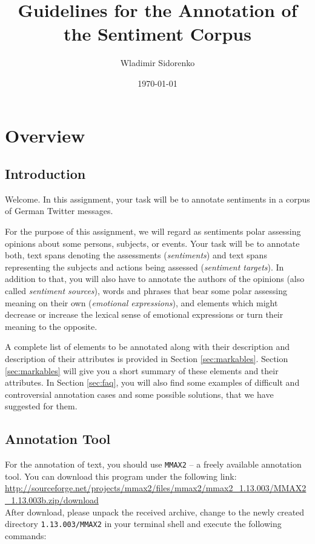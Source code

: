 \documentclass[11pt,a4paper]{article}
\author{Wladimir Sidorenko}
\date{\today}
\title{Guidelines for the Annotation of the Sentiment Corpus}
\begin{document}
\maketitle{}
\section{Overview}
\subsection{Introduction}

Welcome.  In this assignment, your task will be to annotate sentiments in a
corpus of German Twitter messages.

For the purpose of this assignment, we will regard as sentiments polar
assessing opinions about some persons, subjects, or events.  Your task will be
to annotate both, text spans denoting the assessments (\textit{sentiments})
and text spans representing the subjects and actions being assessed
(\textit{sentiment targets}).  In addition to that, you will also have to
annotate the authors of the opinions (also called \textit{sentiment sources}),
words and phrases that bear some polar assessing meaning on their own
(\textit{emotional expressions}), and elements which might decrease or
increase the lexical sense of emotional expressions or turn their meaning to
the opposite.

A complete list of elements to be annotated along with their description and
description of their attributes is provided in Section \ref{sec:markables}.
Section \ref{sec:markables} will give you a short summary of these elements
and their attributes.  In Section \ref{sec:faq}, you will also find some
examples of difficult and controversial annotation cases and some possible
solutions, that we have suggested for them.

\subsection{Annotation Tool}

For the annotation of text, you should use \texttt{MMAX2} -- a freely
available annotation tool.  You can download this program under the
following link:\\\newline
{\setlength{\parindent}{0pt}\small\url{http://sourceforge.net/projects/mmax2/files/mmax2/mmax2_1.13.003/MMAX2_1.13.003b.zip/download}}\\\newline
After download, please unpack the received archive, change to the
newly created directory \texttt{1.13.003/MMAX2} in your terminal shell
and execute the following commands:\\
\end{document}
